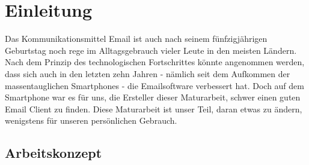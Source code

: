 \documentclass[a4paper,11pt]{article}
\begin{document}
\section{Einleitung}
Das Kommunikationsmittel Email ist auch nach seinem fünfzigjährigen Geburtstag noch rege im Alltagsgebrauch vieler Leute in den meisten Ländern. 
Nach dem Prinzip des technologischen Fortschrittes könnte angenommen werden, dass sich auch in den letzten zehn Jahren - nämlich seit dem Aufkommen der massentauglichen Smartphones - 
die Emailsoftware verbessert hat. Doch auf dem Smartphone war es für uns, die Ersteller dieser Maturarbeit, schwer einen guten Email Client zu finden. 
Diese Maturarbeit ist unser Teil, daran etwas zu ändern, wenigstens für unseren persönlichen Gebrauch. \\

\subsection{Arbeitskonzept}

%
%
\end{document}
